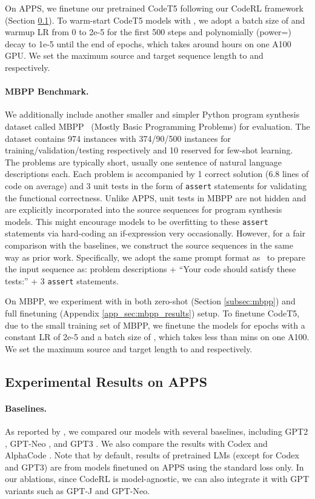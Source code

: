 \documentclass{article}
\begin{document}
On APPS, we finetune our pretrained CodeT5 following our CodeRL framework (Section \ref{subsec:apps}).
To warm-start CodeT5 models with , we adopt a batch size of  and warmup LR from 0 to 2e-5 for the first 500 steps and polynomially (power=) decay to 1e-5 until the end of  epochs, which takes around  hours on one A100 GPU. We set the maximum source and target sequence length to  and  respectively.

\paragraph{MBPP Benchmark.}
We additionally include another smaller and simpler Python program synthesis dataset called MBPP~\citep{austin2021program} (Mostly Basic Programming Problems) for evaluation. The dataset contains 974 instances with 374/90/500 instances for training/validation/testing respectively and 10 reserved for few-shot learning. 
The problems are typically short, usually one sentence of natural language descriptions each.
Each problem is accompanied by 1 correct solution (6.8 lines of code on average) and 3 unit tests in the form of \texttt{assert} statements for validating the functional correctness. Unlike APPS, unit tests in MBPP are not hidden and are explicitly incorporated into the source sequences for program synthesis models. 
This might encourage models to be overfitting to these \texttt{assert} statements via hard-coding an if-expression very occasionally.
However, for a fair comparison with the baselines, we construct the source sequences in the same way as prior work. Specifically, we adopt the same prompt format as~\citep{austin2021program} to prepare the input sequence as: problem descriptions + ``Your code should satisfy these tests:'' + 3 \texttt{assert} statements.

On MBPP, we experiment with in both zero-shot (Section \ref{subsec:mbpp}) and full finetuning (Appendix \ref{app_sec:mbpp_results}) setup. 
To finetune CodeT5, due to the small training set of MBPP, we finetune the models for  epochs with a constant LR of 2e-5 and a batch size of , which takes less than  mins on one A100. We set the maximum source and target  length to  and  respectively.

\subsection{Experimental Results on APPS}
\label{subsec:apps}
\paragraph{Baselines.} 
As reported by \citet{hendrycksapps2021}, we compared our models with several baselines, including GPT2 \citep{radford2019language}, GPT-Neo \citep{black10gpt}, and GPT3 \citep{brown2020language}.
We also compare the results with Codex \citep{chen2021evaluating} and AlphaCode \citep{li2022competition}.
Note that by default, results of pretrained LMs (except for Codex and GPT3) are from models finetuned on APPS using the standard loss  only.
In our ablations, since CodeRL is model-agnostic, we can also integrate it with GPT variants such as GPT-J \citep{gpt-j} and GPT-Neo.
\end{document}
